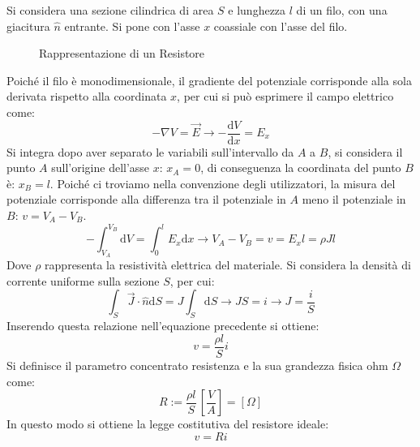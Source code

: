 \documentclass{article}
\newcommand{\df}{\mathrm{d}}
\numberwithin{equation}{subsection}
\begin{document}
Si considera una sezione cilindrica di area $S$ e lunghezza $l$ di un filo, con una giacitura $\hat{n}$ entrante. Si pone con l'asse $x$ coassiale con l'asse del filo. 

\begin{figure}[H]%
    \centering
    \qquad
    \caption{Rappresentazione di un Resistore}
    \label{fig:rappresentazione-resistore}
\end{figure}

Poiché il filo è monodimensionale, il gradiente del potenziale corrisponde alla sola derivata rispetto alla coordinata $x$, per cui si può esprimere il campo elettrico come:
\begin{equation*}
    -\nabla V=\vec{E}\to\displaystyle-\frac{\df V}{\df  x}=E_x
\end{equation*}
Si integra dopo aver separato le variabili sull'intervallo da $A$ a $B$, si considera il punto $A$ sull'origine dell'asse $x$: $x_A=0$, di conseguenza la coordinata del punto 
$B$ è: $x_B=l$. Poiché ci troviamo nella convenzione degli utilizzatori, la misura del potenziale corrisponde alla differenza tra il potenziale in $A$ meno il potenziale in $B$:
$v=V_A-V_B$. 
\begin{equation*}
    \displaystyle-\int_{V_A}^{V_B}\df V=\int_0^lE_x\df x\to V_A-V_B=v=E_xl=\rho Jl
\end{equation*}
Dove $\rho$ rappresenta la resistività elettrica del materiale. Si considera la densità di corrente uniforme sulla sezione $S$, per cui:
\begin{equation*}
    \displaystyle\int_S\vec{J}\cdot\hat{n}\df S=J\int_S\df S\to JS=i\to J=\frac{i}{S}
\end{equation*}
Inserendo questa relazione nell'equazione precedente si ottiene:
\begin{equation*}
    v=\displaystyle\frac{\rho l}{S}i
\end{equation*}
Si definisce il parametro concentrato resistenza e la sua grandezza fisica ohm $\Omega$ come:
\begin{equation*}
    R:=\displaystyle\frac{\rho  l}{S}\,\left[\frac{V}{A}\right]=[\Omega]
\end{equation*}
In questo modo si ottiene la legge costitutiva del resistore ideale:
\begin{equation}
    v=Ri
\end{equation}
\end{document}
